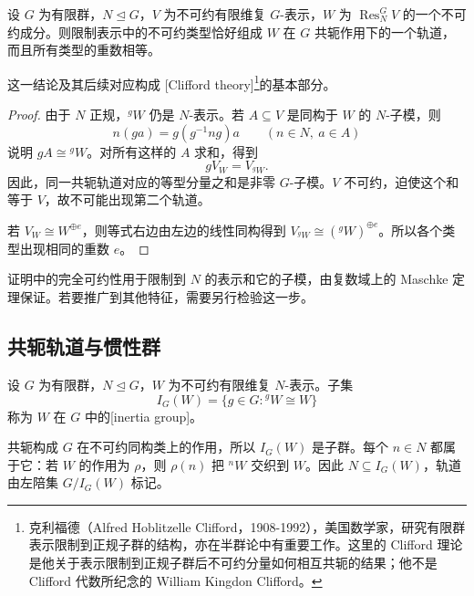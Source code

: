 \begin{theorem}\label{b5:thm:clifford-restriction}
	设 \(G\) 为有限群，\(N\trianglelefteq G\)，\(V\) 为不可约有限维复 \(G\)-表示，\(W\) 为 \(\operatorname{Res}_N^G V\) 的一个不可约成分。则限制表示中的不可约类型恰好组成 \(W\) 在 \(G\) 共轭作用下的一个轨道，而且所有类型的重数相等。
\end{theorem}
这一结论及其后续对应构成 [Clifford theory]\footnote{克利福德（Alfred Hoblitzelle Clifford，1908-1992），美国数学家，研究有限群表示限制到正规子群的结构，亦在半群论中有重要工作。这里的 Clifford 理论是他关于表示限制到正规子群后不可约分量如何相互共轭的结果；他不是 Clifford 代数所纪念的 William Kingdon Clifford。}的基本部分。
\begin{proof}
	由于 \(N\) 正规，\({}^gW\) 仍是 \(N\)-表示。若 \(A\subseteq V\) 是同构于 \(W\) 的 \(N\)-子模，则
	\[
		n(ga)=g(g^{-1}ng)a\qquad(n\in N,\ a\in A)
	\]
	说明 \(gA\cong{}^gW\)。对所有这样的 \(A\) 求和，得到
	\begin{equation}\label{b5:eq:clifford-component-transport}
		gV_W=V_{{}^gW}.
	\end{equation}
	因此，同一共轭轨道对应的等型分量之和是非零 \(G\)-子模。\(V\) 不可约，迫使这个和等于 \(V\)，故不可能出现第二个轨道。

	若 \(V_W\cong W^{\oplus e}\)，则等式右边由左边的线性同构得到 \(V_{{}^gW}\cong({}^gW)^{\oplus e}\)。所以各个类型出现相同的重数 \(e\)。
\end{proof}

证明中的完全可约性用于限制到 \(N\) 的表示和它的子模，由复数域上的 Maschke 定理保证。若要推广到其他特征，需要另行检验这一步。

\subsection{共轭轨道与惯性群}
\label{b5:subsec:0403:02}

\begin{definition}\label{b5:def:inertia-group}
	设 \(G\) 为有限群，\(N\trianglelefteq G\)，\(W\) 为不可约有限维复 \(N\)-表示。子集
	\[
		I_G(W)=\{g\in G:{}^gW\cong W\}
	\]
	称为 \(W\) 在 \(G\) 中的[inertia group]。
\end{definition}

共轭构成 \(G\) 在不可约同构类上的作用，所以 \(I_G(W)\) 是子群。每个 \(n\in N\) 都属于它：若 \(W\) 的作用为 \(\rho\)，则 \(\rho(n)\) 把 \({}^nW\) 交织到 \(W\)。因此 \(N\subseteq I_G(W)\)，轨道由左陪集 \(G/I_G(W)\) 标记。

